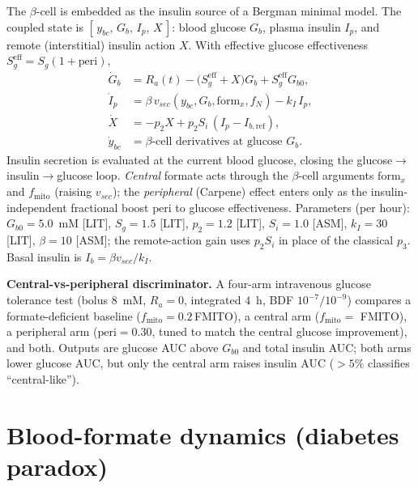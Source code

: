 \documentclass[11pt]{article}
\begin{document}
The $\beta$-cell is embedded as the insulin source of a Bergman minimal model.
The coupled state is $[\,y_{bc},\,G_b,\,I_p,\,X\,]$: blood glucose $G_b$, plasma
insulin $I_p$, and remote (interstitial) insulin action $X$. With effective
glucose effectiveness $S_g^{\mathrm{eff}}=S_g(1+\mathrm{peri})$,
\begin{align}
\dot G_b&=R_a(t)-\big(S_g^{\mathrm{eff}}+X\big)G_b+S_g^{\mathrm{eff}}G_{b0},\\
\dot I_p&=\beta\,v_{sec}(y_{bc},G_b,\mathrm{form}_x,f_N)-k_I\,I_p,\\
\dot X&=-p_2 X+p_2 S_i\,(I_p-I_{b,\mathrm{ref}}),\\
\dot y_{bc}&=\text{$\beta$-cell derivatives at glucose }G_b.
\end{align}
Insulin secretion is evaluated at the current blood glucose, closing the
glucose$\to$insulin$\to$glucose loop. \emph{Central} formate acts through the
$\beta$-cell arguments $\mathrm{form}_x$ and $f_{\mathrm{mito}}$ (raising $v_{sec}$);
the \emph{peripheral} (Carpene) effect enters only as the insulin-independent
fractional boost $\mathrm{peri}$ to glucose effectiveness. Parameters (per hour):
$G_{b0}=5.0$~mM [LIT], $S_g=1.5$ [LIT], $p_2=1.2$ [LIT], $S_i=1.0$ [ASM],
$k_I=30$ [LIT], $\beta=10$ [ASM]; the remote-action gain uses $p_2 S_i$ in place
of the classical $p_3$. Basal insulin is $I_b=\beta v_{sec}/k_I$.

\textbf{Central-vs-peripheral discriminator.} A four-arm intravenous glucose
tolerance test (bolus $8$~mM, $R_a=0$, integrated $4$~h, BDF $10^{-7}/10^{-9}$)
compares a formate-deficient baseline ($f_{\mathrm{mito}}=0.2\,$FMITO), a central
arm ($f_{\mathrm{mito}}=$ FMITO), a peripheral arm ($\mathrm{peri}=0.30$, tuned to
match the central glucose improvement), and both. Outputs are glucose AUC above
$G_{b0}$ and total insulin AUC; both arms lower glucose AUC, but only the central
arm raises insulin AUC ($>5\%$ classifies ``central-like'').

\section{Blood-formate dynamics (diabetes paradox)}\label{sec:fd}
\end{document}
